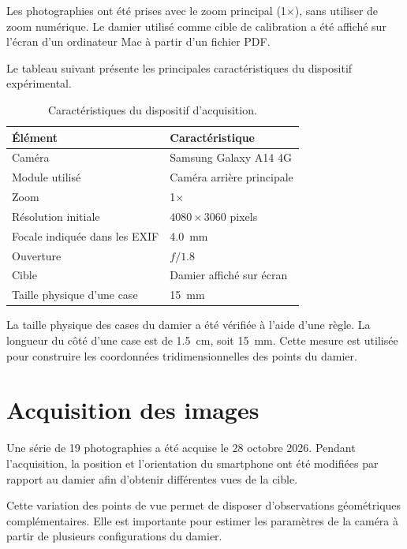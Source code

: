 \documentclass[12pt,a4paper]{report}
\begin{document}
Les photographies ont été prises avec le zoom
principal (1$\times$), sans utiliser de zoom numérique.
Le damier utilisé comme cible de calibration a été
affiché sur l'écran d'un ordinateur Mac à partir
d'un fichier PDF.

Le tableau suivant présente les principales
caractéristiques du dispositif expérimental.

\begin{table}[H]
    \centering
    \caption{Caractéristiques du dispositif d'acquisition.}
    \label{tab:acquisition}
    \begin{tabular}{ll}
        \toprule
        \textbf{Élément} & \textbf{Caractéristique} \\
        \midrule
        Caméra & Samsung Galaxy A14 4G \\
        Module utilisé & Caméra arrière principale \\
        Zoom & 1$\times$ \\
        Résolution initiale & $4080 \times 3060$ pixels \\
        Focale indiquée dans les EXIF & \SI{4.0}{mm} \\
        Ouverture & $f/1.8$ \\
        Cible & Damier affiché sur écran \\
        Taille physique d'une case & \SI{15}{mm} \\
        \bottomrule
    \end{tabular}
\end{table}

La taille physique des cases du damier a été vérifiée
à l'aide d'une règle. La longueur du côté d'une case
est de \SI{1.5}{cm}, soit \SI{15}{mm}. Cette mesure
est utilisée pour construire les coordonnées
tridimensionnelles des points du damier.

\section{Acquisition des images}

Une série de 19 photographies a été acquise le
28 octobre 2026. Pendant l'acquisition, la position
et l'orientation du smartphone ont été modifiées
par rapport au damier afin d'obtenir différentes
vues de la cible.

Cette variation des points de vue permet de disposer
d'observations géométriques complémentaires. Elle
est importante pour estimer les paramètres de la
caméra à partir de plusieurs configurations du damier.
\end{document}
